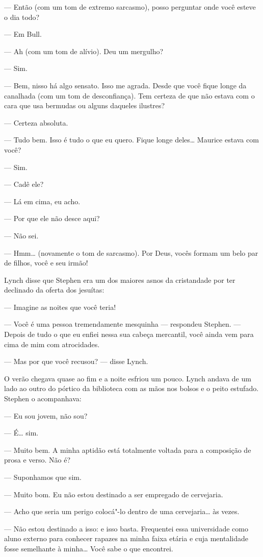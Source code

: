 --- Então (com um tom de extremo sarcasmo), posso perguntar onde
você esteve o dia todo?

--- Em Bull.

--- Ah (com um tom de alívio).  Deu um mergulho?

--- Sim.

--- Bem, nisso há algo sensato.  Isso me agrada.  Desde que você
fique longe da canalhada (com um tom de desconfiança).  Tem certeza de
que não estava com o cara que usa bermudas ou alguns daqueles ilustres?

--- Certeza absoluta.

--- Tudo bem.  Isso é tudo o que eu quero.  Fique longe deles\ldots{} 
Maurice estava com você?

--- Sim.

--- Cadê ele?

--- Lá em cima, eu acho.

--- Por que ele não desce aqui?

--- Não sei.

--- Hmm\ldots{} (novamente o tom de sarcasmo).  Por Deus, vocês formam
um belo par de filhos, você e seu irmão!

Lynch disse que Stephen era um dos maiores asnos da cristandade por
ter declinado da oferta dos jesuítas:

--- Imagine as noites que você teria!

--- Você é uma pessoa tremendamente mesquinha --- respondeu
Stephen.  --- Depois de tudo o que eu enfiei nessa sua cabeça mercantil,
você ainda vem para cima de mim com atrocidades.

--- Mas por que você recusou? --- disse Lynch.

O verão chegava quase ao fim e a noite esfriou um pouco.  Lynch
andava de um lado ao outro do pórtico da biblioteca com as mãos nos
bolsos e o peito estufado.  Stephen o acompanhava:

--- Eu sou jovem, não sou?

--- É\ldots{} sim.

--- Muito bem.  A minha aptidão está totalmente voltada para a
composição de prosa e verso.  Não é?

--- Suponhamos que sim.

--- Muito bom.  Eu não estou destinado a ser empregado de
cervejaria.

--- Acho que seria um perigo colocá"-lo dentro de uma
cervejaria\ldots{} às vezes.

--- Não estou destinado a isso: e isso basta.  Frequentei essa
universidade como aluno externo para conhecer rapazes na minha faixa
etária e cuja mentalidade fosse semelhante à minha\ldots{}  Você sabe o que
encontrei.

